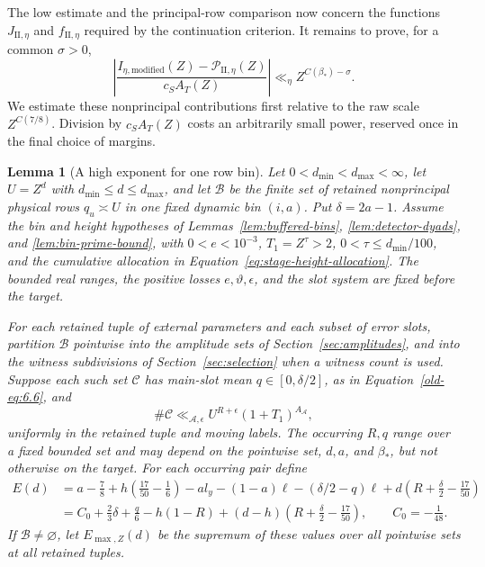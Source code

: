 \documentclass[11pt,a4paper]{article}
\numberwithin{equation}{section}
\numberwithin{figure}{section}
\newtheorem{lemma}[theorem]{Lemma}
\theoremstyle{definition}
\theoremstyle{remark}
\begin{document}
The low estimate and the principal-row comparison now concern the functions
$J_{\mathrm{II},\eta}$ and $f_{\mathrm{II},\eta}$ required by the continuation
criterion. It remains to prove, for a common $\sigma>0$,
\[
 \left|\frac{I_{\eta,\mathrm{modified}}(Z)
                -\mathscr P_{\mathrm{II},\eta}(Z)}{c_S A_T(Z)}\right|
 \ll_\eta Z^{C(\beta_*)-\sigma}.
\]
We estimate these nonprincipal contributions first relative to the raw
scale $Z^{C(7/8)}$. Division by $c_S A_T(Z)$ costs an arbitrarily small
power, reserved once in the final choice of margins.


\begin{lemma}[A high exponent for one row bin]\label{lem:high-bin}
Let \(0<d_{\min}<d_{\max}<\infty\), let \(U=Z^d\) with
\(d_{\min}\le d\le d_{\max}\), and let
\(\mathcal B\) be the finite set of retained nonprincipal physical rows
\(q_u\asymp U\) in one fixed dynamic bin \((i,a)\).  Put
\(\delta=2a-1\).  Assume the bin and height hypotheses of
Lemmas~\ref{lem:buffered-bins}, \ref{lem:detector-dyads}, and
\ref{lem:bin-prime-bound}, with
\(0<e<10^{-3}\), \(T_1=Z^\tau>2\), \(0<\tau\le d_{\min}/100\), and the cumulative
allocation in Equation~\eqref{eq:stage-height-allocation}.
The bounded real ranges, the positive losses \(e,\vartheta,\epsilon\), and the
slot system are fixed before the target.

For each retained tuple of external parameters and each subset of error
slots, partition \(\mathcal B\) pointwise into the amplitude sets of
Section~\ref{sec:amplitudes}, and into the witness subdivisions of
Section~\ref{sec:selection} when a witness count is used.  Suppose each
such set \(\mathcal C\) has main-slot mean \(q\in[0,\delta/2]\), as in
Equation~\eqref{old-eq:6.6}, and
\[
 \#\mathcal C\ll_{\mathcal A,\epsilon}
 U^{R+\epsilon}(1+T_1)^{A_{\mathcal A}},
\]
uniformly in the retained tuple and moving labels.  The occurring \(R,q\)
range over a fixed bounded set and may depend on the pointwise set, \(d,a\),
and \(\beta_*\), but not otherwise on the target.  For each occurring pair
define
\begin{equation}\label{eq:common-high-exponent}
 \begin{split}
 E(d)
 &=a-\frac78+h\left(\frac{17}{50}-\frac16\right)
       -a l_y-(1-a)\ell-(\delta/2-q)\ell
       +d\left(R+\frac\delta2-\frac{17}{50}\right)\\
 &=C_0+\frac23\delta+\frac q6-h(1-R)
       +(d-h)\left(R+\frac\delta2-\frac{17}{50}\right),
       \qquad C_0=-\frac1{48}.
 \end{split}
\end{equation}
If \(\mathcal B\ne\varnothing\), let \(E_{\max,Z}(d)\) be the supremum
of these values over all pointwise sets at all retained tuples.


\end{lemma}
\end{document}
